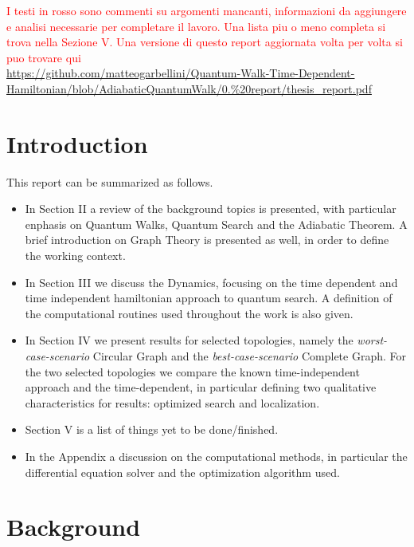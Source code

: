 \documentclass[aps,pra,reprint, onecolumn]{revtex4-2}
\newcommand{\red}[1]{\textcolor{red}{#1}}
\begin{document}

\red{I testi in rosso sono commenti su argomenti mancanti, informazioni da aggiungere e analisi necessarie per completare il lavoro. Una lista piu o meno completa si trova nella Sezione V. Una versione di questo report aggiornata volta per volta si puo trovare qui}\\ {\footnotesize \url{https://github.com/matteogarbellini/Quantum-Walk-Time-Dependent-Hamiltonian/blob/AdiabaticQuantumWalk/0.%20report/thesis_report.pdf}}

\section{Introduction}
This report can be summarized as follows.
\begin{itemize}
\item In Section II a review of the background topics is presented, with particular enphasis on Quantum Walks, Quantum Search and the Adiabatic Theorem. A brief introduction on Graph Theory is presented as well, in order to define the working context.
\item In Section III we discuss the Dynamics, focusing on the time dependent and time independent hamiltonian approach to quantum search. A definition of the computational routines used throughout the work is also given.
\item In Section IV we present results for selected topologies, namely the \textit{worst-case-scenario} Circular Graph and the \textit{best-case-scenario} Complete Graph. For the two selected topologies we compare the known time-independent approach and the time-dependent, in particular defining two qualitative characteristics for results: optimized search and localization.
\item Section V is a list of things yet to be done/finished.
\item In the Appendix a discussion on the computational methods, in particular the differential equation solver and the optimization algorithm used.
\end{itemize}

\section{Background}
\end{document}
